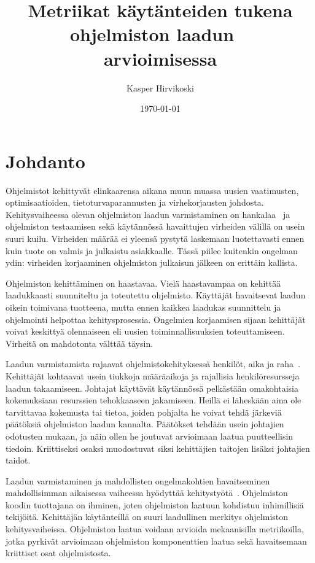 \documentclass[finnish]{../tktltiki2}
\title{Metriikat käytänteiden tukena ohjelmiston laadun \ \\arvioimisessa}
\author{Kasper Hirvikoski}
\date{\today}
\theoremstyle{definition}
\theoremstyle{remark}
\begin{document}

\frontmatter

\maketitle
\setcounter{page}{2}
\makeabstract

\thispagestyle{empty}
\tableofcontents


\mainmatter

\section{Johdanto}

Ohjelmistot kehittyvät elinkaarensa aikana muun muassa uusien vaatimusten, optimisaatioiden, tietoturvaparannusten ja 
virhekorjausten johdosta. Kehitysvaiheessa olevan ohjelmiston laadun varmistaminen on 
hankalaa~\cite{BBM96, NB05, NB07, ZN08, MNDT09} ja ohjelmiston testaamisen sekä käytännössä havaittujen virheiden välillä 
on usein suuri kuilu. Virheiden määrää ei yleensä pystytä laskemaan luotettavasti ennen kuin tuote on valmis ja 
julkaistu asiakkaalle. Tässä piilee kuitenkin ongelman ydin: virheiden korjaaminen ohjelmiston julkaisun jälkeen on 
erittäin kallista.

    Ohjelmiston kehittäminen on haastavaa. Vielä haastavampaa on kehittää laadukkaasti suunniteltu ja toteutettu 
ohjelmisto. Käyttäjät havaitsevat laadun oikein toimivana tuotteena, mutta ennen kaikkea laadukas suunnittelu ja 
ohjelmointi helpottaa kehitysprosessia.  Ongelmien korjaamisen sijaan kehittäjät voivat keskittyä olennaiseen eli uusien 
toiminnallisuuksien toteuttamiseen. Virheitä on mahdotonta välttää täysin.

    Laadun varmistamista rajaavat ohjelmistokehityksessä henkilöt, aika ja raha~\cite{BBM96, ZN08}. Kehittäjät kohtaavat 
usein tiukkoja määräaikoja ja rajallisia henkilöresursseja laadun takaamiseen. Johtajat käyttävät käytännössä pelkästään 
omakohtaisia kokemuksiaan resurssien tehokkaaseen jakamiseen. Heillä ei läheskään aina ole tarvittavaa kokemusta tai 
tietoa, joiden pohjalta he voivat tehdä järkeviä päätöksiä ohjelmiston laadun kannalta. Päätökset tehdään usein 
johtajien odotusten mukaan, ja näin ollen he joutuvat arvioimaan laatua puutteellisin tiedoin. Kriittiseksi osaksi 
muodostuvat siksi kehittäjien taitojen lisäksi johtajien taidot.

    Laadun varmistaminen ja mahdollisten ongelmakohtien havaitseminen mahdollisimman aikaisessa vaiheessa hyödyttää 
kehitystyötä~\cite{BBM96, NB05}. Ohjelmiston koodin tuottajana on ihminen, joten ohjelmiston laatuun kohdistuu 
inhimillisiä tekijöitä. Kehittäjän käytänteillä on suuri laadullinen merkitys ohjelmiston kehitysvaiheissa. Ohjelmiston 
laatua voidaan arvioida mekaanisilla metriikoilla, jotka pyrkivät arvioimaan ohjelmiston komponenttien laatua sekä 
havaitsemaan kriittiset osat ohjelmistosta.
\end{document}
